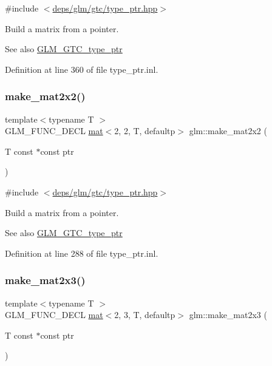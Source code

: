 {\ttfamily \#include $<$\hyperlink{type__ptr_8hpp}{deps/glm/gtc/type\+\_\+ptr.\+hpp}$>$}

Build a matrix from a pointer. \begin{DoxySeeAlso}{See also}
\hyperlink{group__gtc__type__ptr}{G\+L\+M\+\_\+\+G\+T\+C\+\_\+type\+\_\+ptr} 
\end{DoxySeeAlso}


Definition at line 360 of file type\+\_\+ptr.\+inl.

\mbox{\label{group__gtc__type__ptr_gae49e1c7bcd5abec74d1c34155031f663}} 
\subsubsection{\texorpdfstring{make\+\_\+mat2x2()}{make\_mat2x2()}}
{\footnotesize\ttfamily template$<$typename T $>$ \\
G\+L\+M\+\_\+\+F\+U\+N\+C\+\_\+\+D\+E\+CL \hyperlink{structglm_1_1mat}{mat}$<$2, 2, T, defaultp$>$ glm\+::make\+\_\+mat2x2 (\begin{DoxyParamCaption}\item[{T const $\ast$const}]{ptr }\end{DoxyParamCaption})}



{\ttfamily \#include $<$\hyperlink{type__ptr_8hpp}{deps/glm/gtc/type\+\_\+ptr.\+hpp}$>$}

Build a matrix from a pointer. \begin{DoxySeeAlso}{See also}
\hyperlink{group__gtc__type__ptr}{G\+L\+M\+\_\+\+G\+T\+C\+\_\+type\+\_\+ptr} 
\end{DoxySeeAlso}


Definition at line 288 of file type\+\_\+ptr.\+inl.

\mbox{\label{group__gtc__type__ptr_ga21982104164789cf8985483aaefc25e8}} 
\subsubsection{\texorpdfstring{make\+\_\+mat2x3()}{make\_mat2x3()}}
{\footnotesize\ttfamily template$<$typename T $>$ \\
G\+L\+M\+\_\+\+F\+U\+N\+C\+\_\+\+D\+E\+CL \hyperlink{structglm_1_1mat}{mat}$<$2, 3, T, defaultp$>$ glm\+::make\+\_\+mat2x3 (\begin{DoxyParamCaption}\item[{T const $\ast$const}]{ptr }\end{DoxyParamCaption})}



